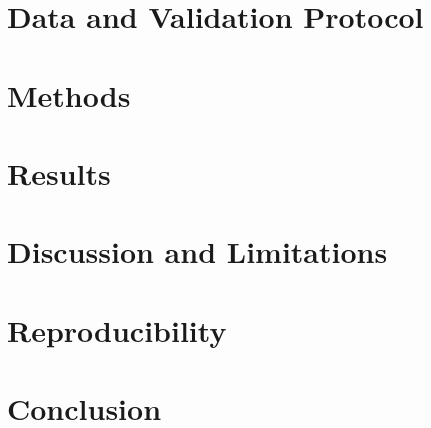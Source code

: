 \documentclass[sigconf,anonymous,review]{acmart}
\begin{document}
\section{Data and Validation Protocol}

\section{Methods}

\section{Results}

\section{Discussion and Limitations}

\section{Reproducibility}

\section{Conclusion}



\end{document}
